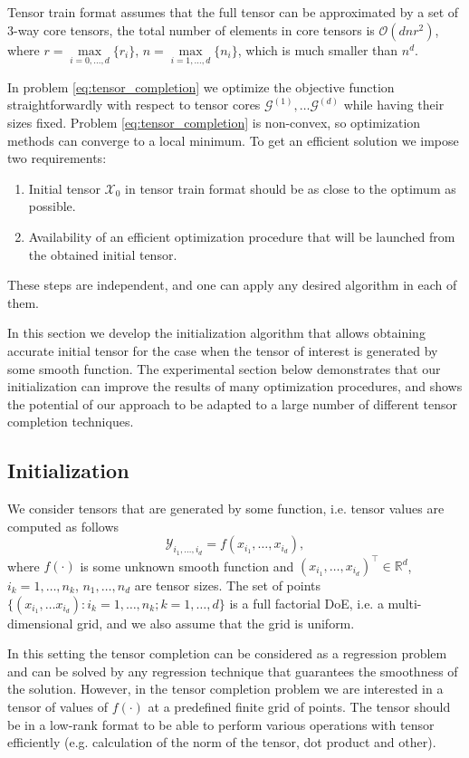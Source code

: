 Tensor train format assumes that the full tensor can be approximated by
a set of $3$-way core tensors, the total number of elements in
core tensors is $\mathcal{O}(dnr^2)$, where
$r = \max\limits_{i = 0, \ldots, d}\{r_i\}$,
$n = \max\limits_{i = 1, \ldots, d}\{n_i\}$,
which is much smaller than $n^d$.

In problem \eqref{eq:tensor_completion} we optimize the objective
function straightforwardly with respect to tensor cores
$\mathcal{G}^{(1)}, \ldots \mathcal{G}^{(d)}$ while having their sizes fixed.
Problem \eqref{eq:tensor_completion} is non-convex, so
optimization methods can converge to a local minimum.
To get an efficient solution we impose two requirements:
\begin{enumerate}
    \item Initial tensor $\mathcal{X}_0$ in tensor train format should be as close to the optimum as possible.
    \item Availability of an efficient optimization procedure that will be launched from the obtained initial tensor.
\end{enumerate}
These steps are independent, and one can apply any desired algorithm in each of them.

In this section we develop the initialization algorithm that allows obtaining accurate initial tensor for the case when the tensor of interest is generated by some smooth function.
The experimental section below demonstrates that our initialization can improve the results of
many optimization procedures, and shows the potential of our approach to be adapted
to a large number of different tensor completion techniques.


\subsection{Initialization}
\label{sec:tensor_completion_init}
We consider tensors that are generated by some function,
i.e. tensor values are computed as follows
\[
\mathcal{Y}_{i_1, \ldots, i_d} = f(x_{i_1}, \ldots, x_{i_d}),
\]
where $f(\cdot)$ is some unknown smooth function and
$(x_{i_1}, \ldots, x_{i_d})^\top \in \mathbb{R}^d$,
$i_k = 1, \ldots, n_k$,
$n_1, \ldots, n_d$ are tensor sizes.
The set of points $\{(x_{i_1}, \ldots x_{i_d}): i_k = 1, \ldots, n_k; k = 1, \ldots, d\}$ is a full factorial DoE, i.e. a multi-dimensional grid,
and we also assume that the grid is uniform.

In this setting the tensor completion can be considered as a regression problem and can be solved by any regression technique that guarantees the smoothness of the solution.
However, in the tensor completion problem we are interested in a tensor of values of $f(\cdot)$ at a predefined finite grid of points.
The tensor should be in a low-rank format to be able to perform various operations with tensor efficiently (e.g. calculation of the norm of the tensor, dot product and other).

